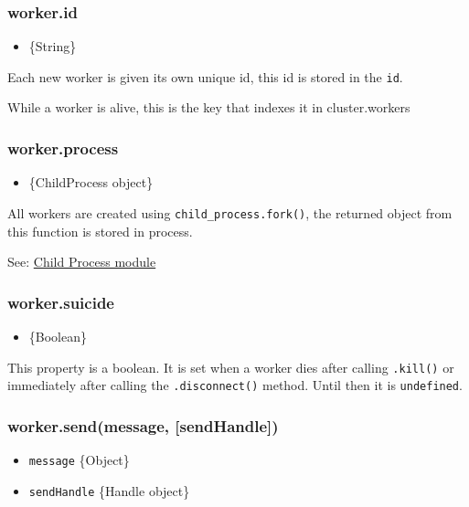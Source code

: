\subsubsection{worker.id}

\begin{itemize}
\item
  \{String\}
\end{itemize}

Each new worker is given its own unique id, this id is stored in the
\texttt{id}.

While a worker is alive, this is the key that indexes it in
cluster.workers

\subsubsection{worker.process}

\begin{itemize}
\item
  \{ChildProcess object\}
\end{itemize}

All workers are created using \texttt{child\_process.fork()}, the
returned object from this function is stored in process.

See: \href{child\_process.html}{Child Process module}

\subsubsection{worker.suicide}

\begin{itemize}
\item
  \{Boolean\}
\end{itemize}

This property is a boolean. It is set when a worker dies after calling
\texttt{.kill()} or immediately after calling the \texttt{.disconnect()}
method. Until then it is \texttt{undefined}.

\subsubsection{worker.send(message, {[}sendHandle{]})}

\begin{itemize}
\item
  \texttt{message} \{Object\}
\item
  \texttt{sendHandle} \{Handle object\}
\end{itemize}

